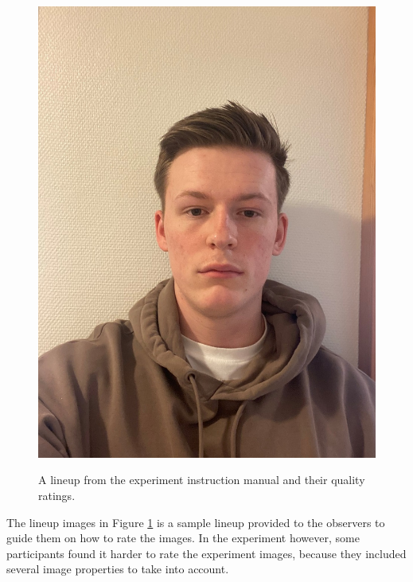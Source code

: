 \begin{figure}[h]
        {\includegraphics[scale = 0.0825]{figures/lineup5.png}}
    \caption{A lineup from the experiment instruction manual and their quality ratings.}
    \label{fig:example-manual}
\end{figure}

The lineup images in Figure \ref{fig:example-manual} is a sample lineup provided to the observers to guide them on how to rate the images. In the experiment however, some participants found it harder to rate the experiment images, because they included several image properties to take into account.

